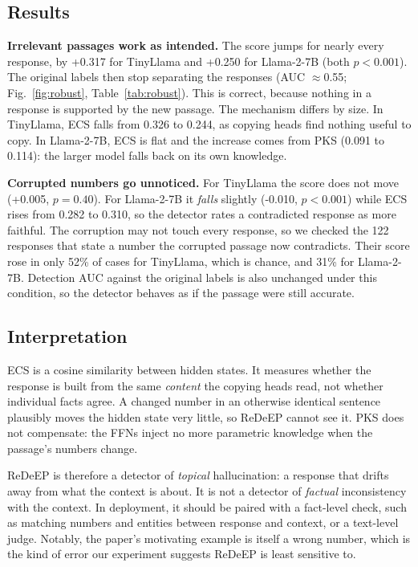 \documentclass[conference]{IEEEtran}
\begin{document}
\subsection{Results}
\textbf{Irrelevant passages work as intended.} The score jumps for nearly every response, by +0.317 for TinyLlama and +0.250 for Llama-2-7B (both $p<0.001$). The original labels then stop separating the responses (AUC $\approx$0.55; Fig.~\ref{fig:robust}, Table~\ref{tab:robust}). This is correct, because nothing in a response is supported by the new passage. The mechanism differs by size. In TinyLlama, ECS falls from 0.326 to 0.244, as copying heads find nothing useful to copy. In Llama-2-7B, ECS is flat and the increase comes from PKS (0.091 to 0.114): the larger model falls back on its own knowledge.

\textbf{Corrupted numbers go unnoticed.} For TinyLlama the score does not move (+0.005, $p=0.40$). For Llama-2-7B it \emph{falls} slightly (-0.010, $p<0.001$) while ECS rises from 0.282 to 0.310, so the detector rates a contradicted response as more faithful. The corruption may not touch every response, so we checked the 122 responses that state a number the corrupted passage now contradicts. Their score rose in only 52\% of cases for TinyLlama, which is chance, and 31\% for Llama-2-7B. Detection AUC against the original labels is also unchanged under this condition, so the detector behaves as if the passage were still accurate.

\subsection{Interpretation}
ECS is a cosine similarity between hidden states. It measures whether the response is built from the same \emph{content} the copying heads read, not whether individual facts agree. A changed number in an otherwise identical sentence plausibly moves the hidden state very little, so ReDeEP cannot see it. PKS does not compensate: the FFNs inject no more parametric knowledge when the passage's numbers change.

ReDeEP is therefore a detector of \emph{topical} hallucination: a response that drifts away from what the context is about. It is not a detector of \emph{factual} inconsistency with the context. In deployment, it should be paired with a fact-level check, such as matching numbers and entities between response and context, or a text-level judge. Notably, the paper's motivating example is itself a wrong number, which is the kind of error our experiment suggests ReDeEP is least sensitive to.
\end{document}
